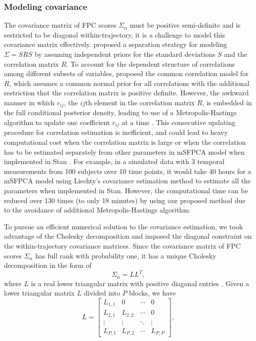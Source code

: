 \documentclass[aoas,preprint]{imsart}
\begin{document}
\subsubsection{Modeling covariance}
The covariance matrix of FPC scores $\Sigma_\alpha$ must be positive semi-definite and is restricted to be diagonal within-trajectory, it is a challenge to model this covariance matrix effectively. \citet{barnard2000modeling} proposed a separation strategy for modeling $\Sigma=SRS$ by assuming independent priors for the standard deviations $S$ and the correlation matrix $R$. To account for the dependent structure of correlations among different subsets of variables, \citet{liechty2004bayesian} proposed the common correlation model for $R$, which assumes a common normal prior for all correlations with the additional restriction that the correlation matrix is positive definite. However, the awkward manner in which $r_{ij}$, the ${ij}$th element in the correlation matrix $R$, is embedded in the full conditional posterior density, leading to use of a Metropolis-Hastings algorithm to update one coefficient $r_{ij}$ at a time \citep{liechty2004bayesian}. This consecutive updating procedure for correlation estimation is inefficient, and could lead to heavy computational cost when the correlation matrix is large or when the correlation has to be estimated separately from other parameters in mSFPCA model when implemented in \textsf{Stan} \citep{carpenter2017stan}. For example, in a simulated data with 3 temporal measurements from 100 subjects over 10 time points, it would take 40 hours for a mSFPCA model using Liechty's covariance estimation method to estimate all the parameters when implemented in Stan. However, the computational time can be reduced over 130 times (to only 18 minutes) by using our proposed method due to the avoidance of additional Metropolis-Hastings algorithm. 

To pursue an efficient numerical solution to the covariance estimation, we took advantage of the Cholesky decomposition \citep{nash1990cholesky} and imposed the diagonal constraint on the within-trajectory covariance matrices. Since the covariance matrix of FPC scores $\Sigma_\alpha$ has full rank with probability one, it has a unique Cholesky decomposition in the form of
\begin{equation}
\Sigma_\alpha = L L^T, \nonumber 
\end{equation}
where $L$ is a real lower triangular matrix with positive diagonal entries \citep{gentle2012numerical} . Given a lower triangular matrix $L$ divided into $P$ blocks, we have
\begin{equation*}
L = 
\begin{bmatrix}
L_{1,1} & 0 & \cdots & 0 \\
L_{2,1} & L_{2,2} & \cdots  & 0 \\
\vdots & \vdots & \ddots & \vdots \\
L_{P,1} & L_{P,2} & \cdots & L_{P,P}
\end{bmatrix},
\end{equation*}
\end{document}
